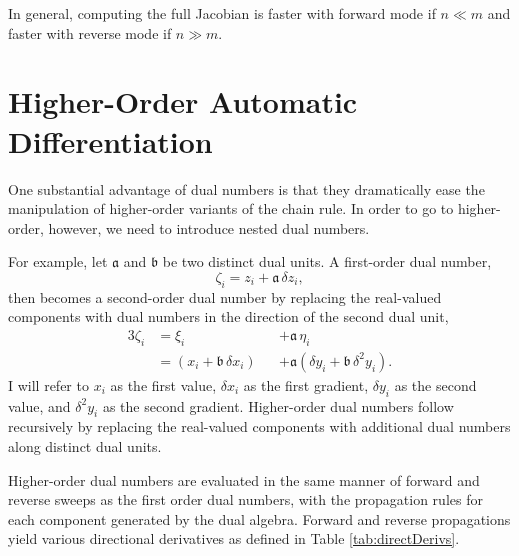 In general, computing the full Jacobian is faster with forward mode if $n \ll m$ 
and faster with reverse mode if $n \gg m$.

\section*{Higher-Order Automatic Differentiation}

One substantial advantage of dual numbers is that they dramatically ease the
manipulation of higher-order variants of the chain rule.  In order to go to 
higher-order, however, we need to introduce nested dual numbers.

For example, let $\mathfrak{a}$ and $\mathfrak{b}$ be two distinct dual units.
A first-order dual number,
%
\begin{equation*}
\zeta_{i} = z_{i} + \mathfrak{a} \, \delta z_{i},
\end{equation*}
%
then becomes a second-order dual number by replacing the 
real-valued components with dual numbers in the direction of the second 
dual unit,
%
\begin{alignat*}{3}
\zeta_{i} 
&=
\xi_{i} 
&&+ \mathfrak{a} \, \eta_{i}
\\
&=
\left( x_{i} + \mathfrak{b} \, \delta x_{i} \right)
&&+ \mathfrak{a} \left( \delta y_{i} + \mathfrak{b} \, \delta^{2} y_{i} \right).
\end{alignat*}
%
I will refer to $x_{i}$ as the first value, $\delta x_{i}$ as the first gradient, 
$\delta y_{i}$ as the second value, and $\delta^{2} y_{i}$
as the second gradient.  Higher-order dual numbers follow recursively 
by replacing the real-valued components with additional dual numbers along 
distinct dual units.

Higher-order dual numbers are evaluated in the same manner of forward and 
reverse sweeps as the first order dual numbers, with the propagation rules
for each component generated by the dual algebra.  Forward and reverse
propagations yield various directional derivatives as defined in Table \ref{tab:directDerivs}.

